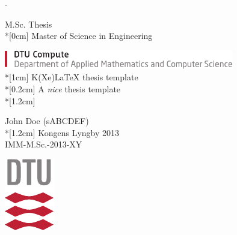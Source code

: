 \thispagestyle{empty}             %
\calccentering{\unitlength}
\begin{adjustwidth*}{\unitlength}{-\unitlength}
    \begin{adjustwidth}{-0.5cm}{-0.5cm}
        \sffamily
        \begin{flushright}
            M.Sc. Thesis\\*[0cm]
            Master of Science in Engineering\\
        \end{flushright}
        \vspace*{\fill}
        \noindent
        \includegraphics[width=0.75\textwidth]{graphics/DTU-Compute-B-UK}\\*[1cm]
        \HUGE K(Xe)LaTeX thesis template\\*[0.2cm]
        \Huge A \emph{nice} thesis template\\*[1.2cm]
        \parbox[b]{0.5\linewidth}{%
            \large John Doe (sABCDEF)\\*[1.2cm]
            \small Kongens Lyngby 2013\\
            \small IMM-M.Sc.-2013-XY
        }
        \hfill\includegraphics[scale=0.7]{graphics/DTU-Logo-CMYK}
    \end{adjustwidth}
\end{adjustwidth*}
\normalfont
\normalsize
